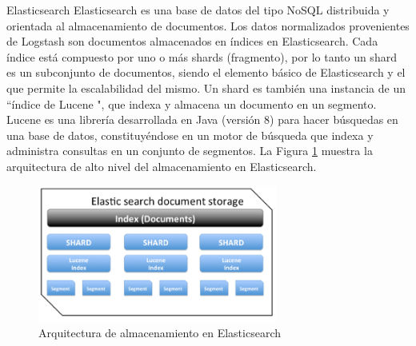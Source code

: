    \begin{subsection}{Elasticsearch}
        Elasticsearch es una base de datos del tipo NoSQL distribuida y orientada al almacenamiento de documentos. Los datos normalizados provenientes de Logstash son documentos almacenados en índices en Elasticsearch. Cada índice está compuesto por uno o más shards (fragmento), por lo tanto un shard es un subconjunto de documentos, siendo el elemento básico de Elasticsearch y el que permite la escalabilidad del mismo. Un shard es también una instancia de un “índice de Lucene \cite{lucene}", que indexa y almacena un documento en un segmento. Lucene es una librería desarrollada en Java (versión 8) para hacer búsquedas en una base de datos, constituyéndose en un motor de búsqueda que indexa y administra consultas en un conjunto de segmentos. La Figura \ref{fig:figura_21_arq_alm_elasticsearch} muestra la arquitectura de alto nivel del almacenamiento en Elasticsearch.
        
        \begin{figure}[H]
            \centering
            \includegraphics[width=0.7\textwidth]{./descripcion_sonion_imagenes/figura_21_arq_alm_elasticsearch.png}
            \caption{Arquitectura de almacenamiento en Elasticsearch}
            \label{fig:figura_21_arq_alm_elasticsearch}
        \end{figure}
    \end{subsection}
